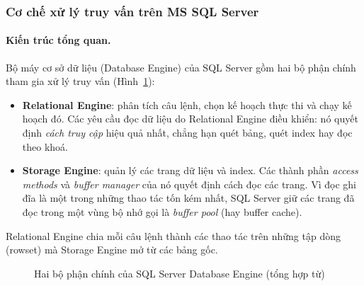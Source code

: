 \subsubsection{Cơ chế xử lý truy vấn trên MS SQL Server}

\paragraph{Kiến trúc tổng quan.}
Bộ máy cơ sở dữ liệu (Database Engine) của SQL Server gồm hai bộ phận chính tham gia xử lý truy vấn (Hình~\ref{fig:mssql-engines}):
\begin{itemize}
    \item \textbf{Relational Engine}: phân tích câu lệnh, chọn kế hoạch thực thi và chạy kế hoạch đó. Các yêu cầu đọc dữ liệu do Relational Engine điều khiển: nó quyết định \textit{cách truy cập} hiệu quả nhất, chẳng hạn quét bảng, quét index hay đọc theo khoá.
    \item \textbf{Storage Engine}: quản lý các trang dữ liệu và index. Các thành phần \textit{access methods} và \textit{buffer manager} của nó quyết định cách đọc các trang. Vì đọc ghi đĩa là một trong những thao tác tốn kém nhất, SQL Server giữ các trang đã đọc trong một vùng bộ nhớ gọi là \textit{buffer pool} (hay buffer cache).
\end{itemize}
Relational Engine chia mỗi câu lệnh thành các thao tác trên những tập dòng (rowset) mà Storage Engine mở từ các bảng gốc.

\begin{figure}[H]
    \centering
    \caption{Hai bộ phận chính của SQL Server Database Engine (tổng hợp từ)}
    \label{fig:mssql-engines}
\end{figure}


